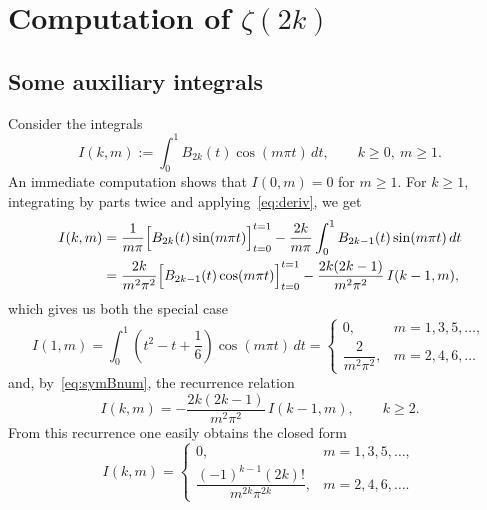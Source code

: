 \documentclass[10pt,reqno]{amsart}
\theoremstyle{remark}
\begin{document}
\section{Computation of $\zeta(2k)$}

\subsection{Some auxiliary integrals}

Consider the integrals
\[
  I(k,m) := \int_0^{1} B_{2k}(t) \cos(m\pi t)\,dt,
  \qquad
  k \geq 0,\ m \geq 1.
\]
An immediate computation shows that $I(0,m) = 0$ for $m \geq 1$. For $k \geq 1$, 
integrating by parts twice and applying~\eqref{eq:deriv}, we get
\begin{align*}
     I(k,m) 
  &=   \frac{1}{m\pi}\Bigl[B_{2k}(t) \sin(m \pi t)\Bigr]_{t=0}^{t=1}
     - \frac{2k}{m\pi} \int_0^{1} B_{2k-1}(t) \sin(m\pi t)\,dt
  \\
  &=   \frac{2k}{m^{2} \pi^{2}} \Bigl[B_{2k-1}(t) \cos(m \pi t) \Bigr]_{t=0}^{t=1}
     - \frac{2k(2k-1)}{m^{2} \pi^{2}} \,I(k-1,m),
\end{align*}
which gives us both the special case
\[
  I(1,m) = \int_0^{1} \left( t^2 - t + \frac{1}{6} \right) \cos(m\pi t)\,dt =
  \begin{cases}
  0, & m=1,3,5,\dots, \\
  \dfrac{2}{m^2 \pi^2}, & m=2,4,6,\dots
  \end{cases}
\]
and, by~\eqref{eq:symBnum}, the recurrence relation
\[
 I(k,m) = - \frac{2k(2k-1)}{m^{2} \pi^{2}} \,I(k-1,m),
 \qquad
 k \geq 2.
\]
From this recurrence one easily obtains the closed form
%
\begin{equation}
\label{eq:evalInt}
    I(k,m) = 
  \begin{cases}
  0, & m=1,3,5,\dots, \\
  \dfrac{(-1)^{k-1}(2k)!}{m^{2k} \pi^{2k}}, & m=2,4,6,\dots.
  \end{cases}
\end{equation}
\end{document}
